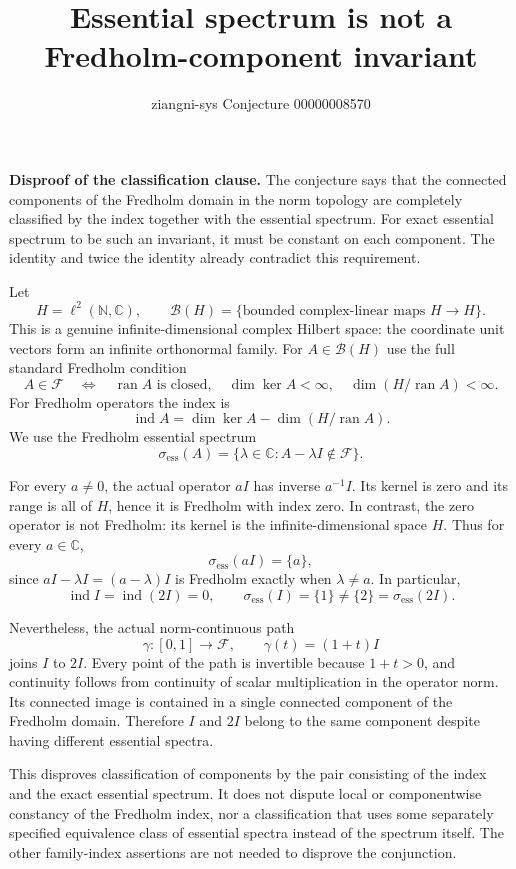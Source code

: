 \documentclass[11pt]{article}
\title{Essential spectrum is not a Fredholm-component invariant}
\author{ziangni-sys \quad Conjecture 00000008570}
\date{}
\begin{document}
\maketitle
\vspace{-2em}
\textbf{Disproof of the classification clause.} The conjecture says that the connected components of the Fredholm domain in the norm topology are completely classified by the index together with the essential spectrum. For exact essential spectrum to be such an invariant, it must be constant on each component. The identity and twice the identity already contradict this requirement.

Let
\[
 H=\ell^2(\mathbb N,\mathbb C),\qquad \mathcal B(H)=\{\text{bounded complex-linear maps }H\to H\}.
\]
This is a genuine infinite-dimensional complex Hilbert space: the coordinate unit vectors form an infinite orthonormal family. For $A\in\mathcal B(H)$ use the full standard Fredholm condition
\[
 A\in\mathcal F
 \quad\Longleftrightarrow\quad
 \operatorname{ran}A\text{ is closed},\quad
 \dim\ker A<\infty,\quad
 \dim(H/\operatorname{ran}A)<\infty.
\]
For Fredholm operators the index is
\[
 \operatorname{ind}A=\dim\ker A-\dim(H/\operatorname{ran}A).
\]
We use the Fredholm essential spectrum
\[
 \sigma_{\mathrm{ess}}(A)=\{\lambda\in\mathbb C:A-\lambda I\notin\mathcal F\}.
\]

For every $a\ne0$, the actual operator $aI$ has inverse $a^{-1}I$. Its kernel is zero and its range is all of $H$, hence it is Fredholm with index zero. In contrast, the zero operator is not Fredholm: its kernel is the infinite-dimensional space $H$. Thus for every $a\in\mathbb C$,
\[
 \sigma_{\mathrm{ess}}(aI)=\{a\},
\]
since $aI-\lambda I=(a-\lambda)I$ is Fredholm exactly when $\lambda\ne a$. In particular,
\[
 \operatorname{ind}I=\operatorname{ind}(2I)=0,
 \qquad \sigma_{\mathrm{ess}}(I)=\{1\}\ne\{2\}=\sigma_{\mathrm{ess}}(2I).
\]

Nevertheless, the actual norm-continuous path
\[
 \gamma:[0,1]\longrightarrow\mathcal F,\qquad \gamma(t)=(1+t)I
\]
joins $I$ to $2I$. Every point of the path is invertible because $1+t>0$, and continuity follows from continuity of scalar multiplication in the operator norm. Its connected image is contained in a single connected component of the Fredholm domain. Therefore $I$ and $2I$ belong to the same component despite having different essential spectra.

This disproves classification of components by the pair consisting of the index and the exact essential spectrum. It does not dispute local or componentwise constancy of the Fredholm index, nor a classification that uses some separately specified equivalence class of essential spectra instead of the spectrum itself. The other family-index assertions are not needed to disprove the conjunction.
\end{document}
